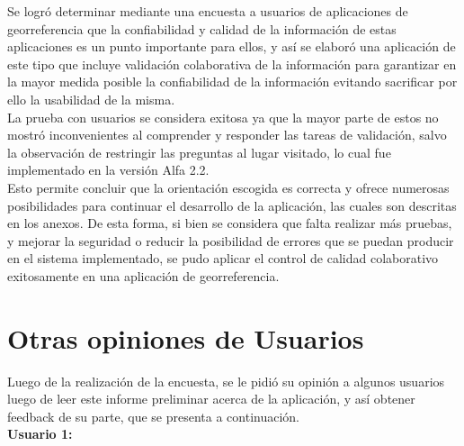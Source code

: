 \documentclass[10pt,letterpaper]{article}
\begin{document}
Se logró determinar mediante una encuesta a usuarios de aplicaciones de georreferencia que la confiabilidad y calidad de la información de estas aplicaciones es un punto importante para ellos, y así se elaboró una aplicación  de este tipo que incluye validación colaborativa de la información para garantizar en la mayor medida posible la confiabilidad de la información evitando sacrificar por ello la usabilidad de la misma.\\

La prueba con usuarios se considera exitosa ya que la mayor parte de estos no mostró inconvenientes al comprender y responder las tareas de validación, salvo la observación de restringir las preguntas al lugar visitado, lo cual fue implementado en la versión Alfa 2.2.\\

Esto permite concluir que la orientación escogida es correcta y ofrece numerosas posibilidades para continuar el desarrollo de la aplicación, las cuales son descritas en los anexos. De esta forma, si bien se considera que falta realizar más pruebas, y mejorar la seguridad o reducir la posibilidad de errores que se puedan producir en el sistema implementado, se pudo aplicar el control de calidad colaborativo exitosamente en una aplicación de georreferencia.\\

\newpage
\appendix
\section{Otras opiniones de Usuarios}

Luego de la realización de la encuesta, se le pidió su opinión a algunos usuarios luego de leer este informe preliminar acerca de la aplicación, y así obtener feedback de su parte, que se presenta a continuación.\\

\textbf{Usuario 1:}\\
\end{document}
